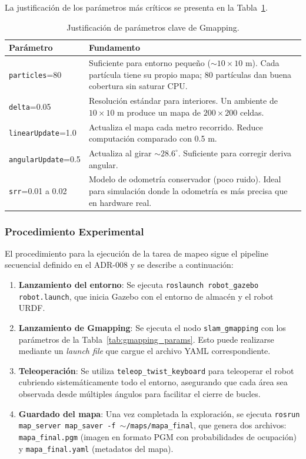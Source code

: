 \documentclass[12pt,letterpaper]{article}
\begin{document}
La justificación de los parámetros más críticos se presenta en la Tabla~\ref{tab:gmapping_just}.

\begin{table}[H]
    \centering
    \caption{Justificación de parámetros clave de Gmapping.}
    \label{tab:gmapping_just}
    \begin{tabular}{lp{8cm}}
        \hline
        \textbf{Parámetro} & \textbf{Fundamento} \\
        \hline
        \texttt{particles}=80 & Suficiente para entorno pequeño ($\sim10\times10$ m). Cada partícula tiene su propio mapa; 80 partículas dan buena cobertura sin saturar CPU. \\
        \texttt{delta}=0.05 & Resolución estándar para interiores. Un ambiente de $10\times10$ m produce un mapa de $200\times200$ celdas. \\
        \texttt{linearUpdate}=1.0 & Actualiza el mapa cada metro recorrido. Reduce computación comparado con 0.5 m. \\
        \texttt{angularUpdate}=0.5 & Actualiza al girar $\sim28.6^\circ$. Suficiente para corregir deriva angular. \\
        \texttt{srr}=0.01 a 0.02 & Modelo de odometría conservador (poco ruido). Ideal para simulación donde la odometría es más precisa que en hardware real. \\
        \hline
    \end{tabular}
\end{table}

\subsubsection{Procedimiento Experimental}

El procedimiento para la ejecución de la tarea de mapeo sigue el pipeline secuencial definido en el ADR-008 \citep{marder2010office} y se describe a continuación:

\begin{enumerate}
    \item \textbf{Lanzamiento del entorno}: Se ejecuta \texttt{roslaunch robot\_gazebo robot.launch}, que inicia Gazebo con el entorno de almacén y el robot URDF.
    \item \textbf{Lanzamiento de Gmapping}: Se ejecuta el nodo \texttt{slam\_gmapping} con los parámetros de la Tabla~\ref{tab:gmapping_params}. Esto puede realizarse mediante un \textit{launch file} que cargue el archivo YAML correspondiente.
    \item \textbf{Teleoperación}: Se utiliza \texttt{teleop\_twist\_keyboard} para teleoperar el robot cubriendo sistemáticamente todo el entorno, asegurando que cada área sea observada desde múltiples ángulos para facilitar el cierre de bucles.
    \item \textbf{Guardado del mapa}: Una vez completada la exploración, se ejecuta \texttt{rosrun map\_server map\_saver -f $\sim$/maps/mapa\_final}, que genera dos archivos: \texttt{mapa\_final.pgm} (imagen en formato PGM con probabilidades de ocupación) y \texttt{mapa\_final.yaml} (metadatos del mapa).
\end{enumerate}
\end{document}
